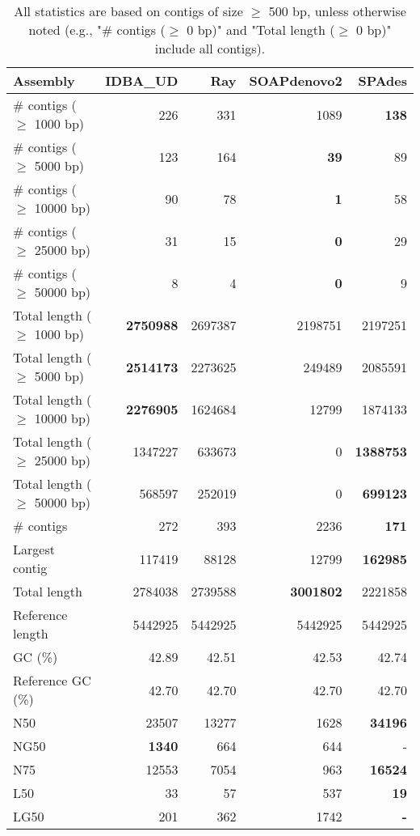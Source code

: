 \documentclass[12pt,a4paper]{article}
\begin{document}
\begin{table}[ht]
\begin{center}
\caption{All statistics are based on contigs of size $\geq$ 500 bp, unless otherwise noted (e.g., "\# contigs ($\geq$ 0 bp)" and "Total length ($\geq$ 0 bp)" include all contigs).}
\begin{tabular}{|l*{4}{|r}|}
\hline
Assembly & IDBA\_UD & Ray & SOAPdenovo2 & SPAdes \\ \hline
\# contigs ($\geq$ 1000 bp) & 226 & 331 & 1089 & {\bf 138} \\ \hline
\# contigs ($\geq$ 5000 bp) & 123 & 164 & {\bf 39} & 89 \\ \hline
\# contigs ($\geq$ 10000 bp) & 90 & 78 & {\bf 1} & 58 \\ \hline
\# contigs ($\geq$ 25000 bp) & 31 & 15 & {\bf 0} & 29 \\ \hline
\# contigs ($\geq$ 50000 bp) & 8 & 4 & {\bf 0} & 9 \\ \hline
Total length ($\geq$ 1000 bp) & {\bf 2750988} & 2697387 & 2198751 & 2197251 \\ \hline
Total length ($\geq$ 5000 bp) & {\bf 2514173} & 2273625 & 249489 & 2085591 \\ \hline
Total length ($\geq$ 10000 bp) & {\bf 2276905} & 1624684 & 12799 & 1874133 \\ \hline
Total length ($\geq$ 25000 bp) & 1347227 & 633673 & 0 & {\bf 1388753} \\ \hline
Total length ($\geq$ 50000 bp) & 568597 & 252019 & 0 & {\bf 699123} \\ \hline
\# contigs & 272 & 393 & 2236 & {\bf 171} \\ \hline
Largest contig & 117419 & 88128 & 12799 & {\bf 162985} \\ \hline
Total length & 2784038 & 2739588 & {\bf 3001802} & 2221858 \\ \hline
Reference length & 5442925 & 5442925 & 5442925 & 5442925 \\ \hline
GC (\%) & 42.89 & 42.51 & 42.53 & 42.74 \\ \hline
Reference GC (\%) & 42.70 & 42.70 & 42.70 & 42.70 \\ \hline
N50 & 23507 & 13277 & 1628 & {\bf 34196} \\ \hline
NG50 & {\bf 1340} & 664 & 644 & - \\ \hline
N75 & 12553 & 7054 & 963 & {\bf 16524} \\ \hline
L50 & 33 & 57 & 537 & {\bf 19} \\ \hline
LG50 & 201 & 362 & 1742 & {\bf -} \\ \hline

\end{tabular}
\end{center}
\end{table}
\end{document}
